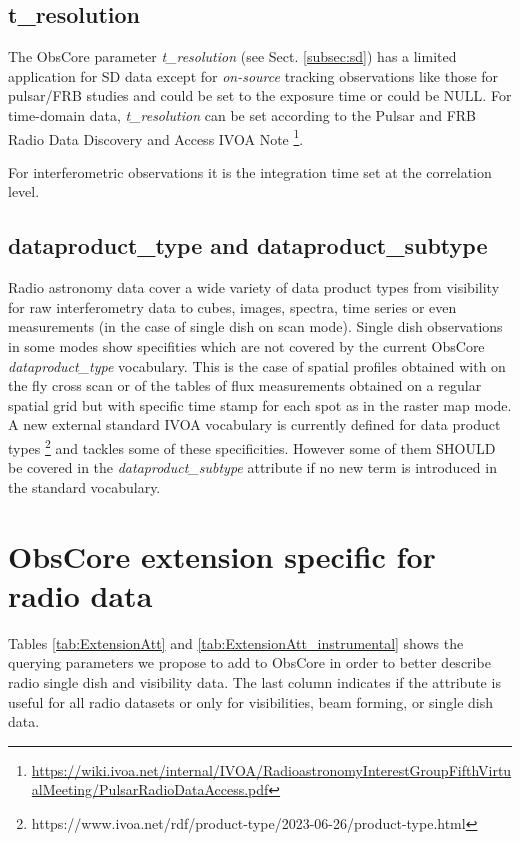 \documentclass[11pt,a4paper]{ivoa}
\begin{document}
\subsection{t\_resolution}
The ObsCore parameter \emph{t\_resolution} (see Sect. \ref{subsec:sd}) has a limited application for SD data
except for \textit{on-source} tracking observations like those for pulsar/FRB studies and could be set to the
exposure time or could be NULL. For time-domain data, \emph{t\_resolution} can be set according to the Pulsar
and FRB Radio Data Discovery and Access IVOA Note \footnote{\url{https://wiki.ivoa.net/internal/IVOA/RadioastronomyInterestGroupFifthVirtualMeeting/PulsarRadioDataAccess.pdf}}.

For interferometric observations it is the integration time set at the correlation level.

\subsection{dataproduct\_type and dataproduct\_subtype}

Radio astronomy data cover a wide variety of data product types from visibility for raw interferometry data to cubes, images, spectra, time series
or even measurements (in the case of single dish on scan mode). Single dish observations in some modes show specifities which are not covered by
the current ObsCore \emph{dataproduct\_type} vocabulary. This is the case of spatial profiles obtained with on the fly cross scan or of the
tables of flux measurements obtained on a regular spatial grid but with specific time stamp for each spot as in the raster map  mode.
A new external standard IVOA vocabulary is currently defined for data product types \footnote{https://www.ivoa.net/rdf/product-type/2023-06-26/product-type.html}
and tackles some of these specificities. However some of them SHOULD be covered in the \emph{dataproduct\_subtype} attribute if no new term is introduced in the standard vocabulary.

\section{ObsCore extension specific for radio data}

Tables \ref{tab:ExtensionAtt} and \ref{tab:ExtensionAtt_instrumental} shows the %
querying parameters we propose to add to ObsCore in order to better describe radio single dish and visibility data.
The last column indicates if the attribute is useful for all radio datasets or only for visibilities, beam forming, or single dish data.
\end{document}
